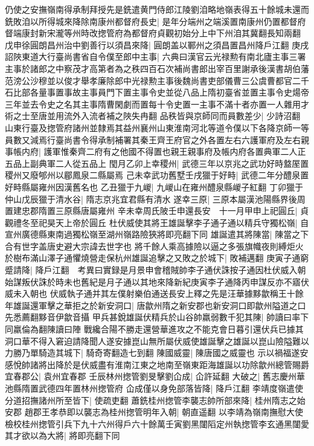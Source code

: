 仍使之安撫嶺南得承制拜授先是銑遣黄門侍郎江陵劉洎略地嶺表得五十餘城未還而銑敗洎以所得城來降除南康州都督府長史|{
	是年分端州之端溪置南康州仍置都督府督端康封新宋瀧等州時改揔管府為都督府貞觀初始分上中下州洎其冀翻長知兩翻}
戊申徐圓朗昌州治中劉善行以須昌來降|{
	圓朗盖以鄆州之須昌置昌州降戶江翻}
庚戌詔陜東道大行臺尚書省自令僕至郎中主事|{
	六典曰漢官云光禄勲有南北廬主事三署主事於諸郎之中察茂才高第者為之秩四百石次補尚書郎出宰百里謝承後漢書胡伯藩范滂公沙穆並以俊才舉孝廉除郎中光禄勲主事後魏尚書吏部儀曹三公虞曹都官二千石比部各量事置事故主事員門下置主事令史並從八品上隋初臺省並置主事令史煬帝三年並去令史之名其主事隋曹閑劇而置每十令史置一主事不滿十者亦置一人雜用才術之士至唐並用流外入流者補之陜失冉翻}
品秩皆與京師同而員數差少|{
	少詩沼翻}
山東行臺及揔管府諸州並隸焉其益州襄州山東淮南河北等道令僕以下各降京師一等員數又減焉行臺尚書令得承制補署其秦王齊王府官之外各置左右六護軍府及左右親事帳内府|{
	護軍惟秦齊二府有之他國不得置也親王親事府及帳内府各置典軍二人正五品上副典軍二人從五品上}
閠月乙卯上幸稷州|{
	武德三年以京兆之武功好時盩厔置稷州又廢郇州以郿鳳泉二縣屬焉}
己未幸武功舊墅壬戌獵于好畤|{
	武德二年分醴泉置好畤縣屬雍州因漢舊名也}
乙丑獵于九嵕|{
	九嵕山在雍州醴泉縣嵕子紅翻}
丁卯獵于仲山戊辰獵于清水谷|{
	隋志京兆宜君縣有清水}
遂幸三原|{
	三原本屬漢池陽縣界後周置建忠郡隋置三原縣唐屬雍州}
辛未幸周氏陂壬申還長安　十一月甲申上祀圓丘|{
	貞觀禮冬至祀昊天上帝於圓丘}
杜伏威使其將王雄誕擊李子通子通以精兵守獨松嶺|{
	自宣州廣德縣東南過獨松嶺至湖州嶺路險狹將即亮翻下同}
雄誕遣其將陳當|{
	陳當之下合有世字盖唐史避大宗諱去世字也}
將千餘人乘高據險以逼之多張旗幟夜則縛炬火於樹布滿山澤子通懼燒營走保杭州雄誕追擊之又敗之於城下|{
	敗補邁翻}
庚寅子通窮蹙請降|{
	降戶江翻　考異曰實録是月景申會稽賊帥李子通伏誅按子通因杜伏威入朝始謀叛伏誅於時未也舊紀是月子通以其地來降新紀庚寅李子通降丙申謀反亦不寤伏威未入朝也}
伏威執子通并其左僕射樂伯通送長安上釋之先是汪華據黟歙稱王十餘年雄誕還軍擊之華拒之於新安洞口|{
	唐歙州隋之新安郡也新安洞口即歙州隘道之口先悉薦翻黟音伊歙音攝}
甲兵甚銳雄誕伏精兵於山谷帥羸弱數千犯其陳|{
	帥讀曰率下同羸倫為翻陳讀曰陣}
戰纔合陽不勝走還營華進攻之不能克會日暮引還伏兵已據其洞口華不得入窘迫請降聞人遂安據崑山無所屬伏威使雄誕擊之雄誕以崑山險隘難以力勝乃單騎造其城下|{
	騎奇寄翻造七到翻}
陳國威靈|{
	陳唐國之威靈也}
示以禍福遂安感悅帥諸將出降於是伏威盡有淮南江東之地南至嶺東距海雄誕以功除歙州總管賜爵宜春郡公|{
	袁州宜春郡}
壬辰林州揔管劉旻擊劉仚成|{
	仚許延翻}
大破之|{
	舊志慶州華池縣隋置武德四年置林州揔管府}
仚成僅以身免部落皆降|{
	降戶江翻}
李靖度嶺遣使分道招撫諸州所至皆下|{
	使疏吏翻}
蕭銑桂州揔管李襲志帥所部來降|{
	桂州隋志之始安郡}
趙郡王孝恭即以襲志為桂州揔管明年入朝|{
	朝直遥翻}
以李靖為嶺南撫慰大使檢校桂州揔管引兵下九十六州得戶六十餘萬壬寅劉黑闥䧟定州執揔管李玄通黑闥愛其才欲以為大將|{
	將即亮翻下同}
